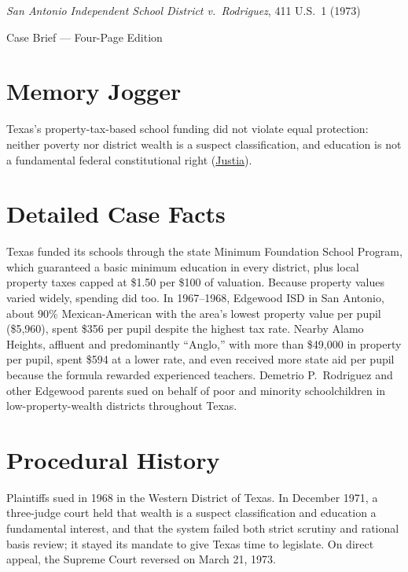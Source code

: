 \documentclass[12pt]{article}
\begin{document}
\begin{center}
{\LARGE \textit{San Antonio Independent School District v.\ Rodriguez}, 411 U.S.\ 1 (1973)\par}
\vspace{0.8em}
{\large Case Brief --- Four-Page Edition\par}
\end{center}
\vspace{1em}

\section{Memory Jogger}

Texas's property-tax-based school funding did not violate equal protection: neither poverty nor district wealth is a suspect classification, and education is not a fundamental federal constitutional right (\href{https://supreme.justia.com/cases/federal/us/411/1/}{Justia}).

\section{Detailed Case Facts}

Texas funded its schools through the state Minimum Foundation School Program, which guaranteed a basic minimum education in every district, plus local property taxes capped at \$1.50 per \$100 of valuation. Because property values varied widely, spending did too. In 1967--1968, Edgewood ISD in San Antonio, about 90\% Mexican-American with the area's lowest property value per pupil (\$5,960), spent \$356 per pupil despite the highest tax rate. Nearby Alamo Heights, affluent and predominantly ``Anglo,'' with more than \$49,000 in property per pupil, spent \$594 at a lower rate, and even received more state aid per pupil because the formula rewarded experienced teachers. Demetrio P.\ Rodriguez and other Edgewood parents sued on behalf of poor and minority schoolchildren in low-property-wealth districts throughout Texas.

\section{Procedural History}

Plaintiffs sued in 1968 in the Western District of Texas. In December 1971, a three-judge court held that wealth is a suspect classification and education a fundamental interest, and that the system failed both strict scrutiny and rational basis review; it stayed its mandate to give Texas time to legislate. On direct appeal, the Supreme Court reversed on March 21, 1973.
\end{document}
